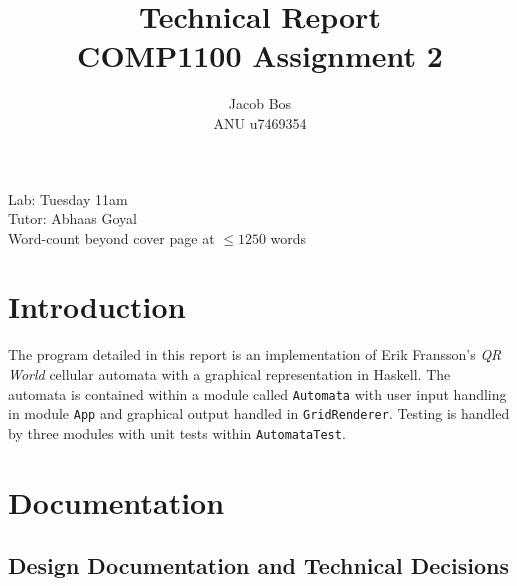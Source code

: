 \documentclass[11pt]{article}
\title{Technical Report\\ COMP1100 Assignment 2}
\author{Jacob Bos\\ ANU u7469354}
\begin{document}
\maketitle
{}
\begin{center}
  Lab: Tuesday 11am\\
  Tutor: Abhaas Goyal\\
  Word-count beyond cover page at $\leq 1250$ words
\end{center}
\tableofcontents
\newpage
{}
\section{Introduction} 
The program detailed in this report is an implementation of Erik Fransson's \textit{QR World} cellular automata with a graphical representation in Haskell. The automata is contained within a module called \verb|Automata| with user input handling in module \verb|App| and graphical output handled in \verb|GridRenderer|. Testing is handled by three modules with unit tests within \verb|AutomataTest|.


\section{Documentation}%
\subsection{Design Documentation and Technical Decisions}
\end{document}
